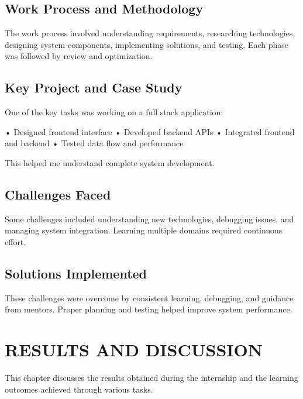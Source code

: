 \documentclass[12pt,a4paper]{report}
\begin{document}
\section{Work Process and Methodology}

The work process involved understanding requirements, researching technologies, designing system components, implementing solutions, and testing. Each phase was followed by review and optimization.


\section{Key Project and Case Study}

One of the key tasks was working on a full stack application:


• Designed frontend interface • Developed backend APIs • Integrated frontend and backend • Tested data flow and performance


This helped me understand complete system development.




\section{Challenges Faced}

Some challenges included understanding new technologies, debugging issues, and managing system integration. Learning multiple domains required continuous effort.


\section{Solutions Implemented}

These challenges were overcome by consistent learning, debugging, and guidance from mentors. Proper planning and testing helped improve system performance.


\chapter{RESULTS AND DISCUSSION}
\label{ch:results}


This chapter discusses the results obtained during the internship and the learning outcomes achieved through various tasks.
\end{document}
